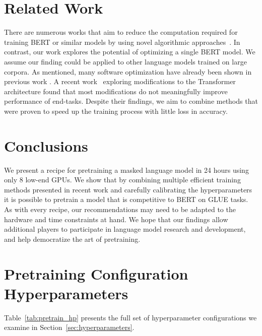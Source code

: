 \documentclass[11pt]{article}
\newcommand{\bertbase}{BERT }
\begin{document}
%
 \section{Related Work}

There are numerous works that aim to reduce the computation required for training BERT or similar models by using novel algorithmic approaches~\cite{clark-etal-2020-learning, Gong2019EfficientTO, yang2020progressively, zhang2020accelerating, Kitaev2020ReformerTE, Wu2019PayLA, Wynter2020OptimalSE}. 
In contrast, our work explores the potential of optimizing a single BERT model. 
We assume our finding could be applied to other language models trained on large corpora.
As mentioned, many software optimization have already been shown in previous work \cite{Shoeybi2019MegatronLMTM, Narayanan2021EfficientLL, deepspeed, ott-etal-2019-fairseq}.
A recent work~\cite{narang2021transformer} exploring modifications to the Transformer architecture found that most modifications do not meaningfully improve performance of end-tasks. 
Despite their findings, we aim to combine methods that were proven to speed up the training process with little loss in accuracy.



\section{Conclusions}

We present a recipe for pretraining a masked language model in 24 hours using only 8 low-end GPUs. 
We show that by combining multiple efficient training methods presented in recent work and carefully calibrating the hyperparameters it is possible to pretrain a model that is competitive to \bertbase on GLUE tasks.
As with every recipe, our recommendations may need to be adapted to the hardware and time constraints at hand.
We hope that our findings allow additional players to participate in language model research and development, and help democratize the art of pretraining.



 




\appendix


\section{Pretraining Configuration Hyperparameters}
\label{appendix:a}
Table~\ref{tab:pretrain_hp} presents the full set of hyperparameter configurations we examine in Section~\ref{sec:hyperparameters}.
\end{document}
